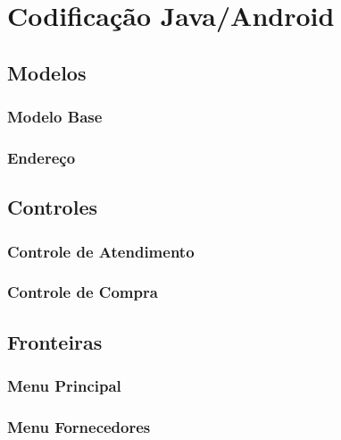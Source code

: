 \section{Codificação Java/Android}


\subsection{Modelos}

\subsubsection{Modelo Base}

\subsubsection{Endereço}



\subsection{Controles}

\subsubsection{Controle de Atendimento}

\subsubsection{Controle de Compra}



\subsection{Fronteiras}

\subsubsection{Menu Principal}

\subsubsection{Menu Fornecedores}
